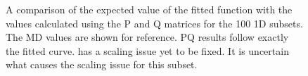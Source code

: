 \documentclass[twoside,senior]{BYUPhys}
\begin{document}
\begin{figure}[ht!]
 \centering
 
 \quad
 \caption[Comparison of the PQ matrices with the expected result for \textlangle{}100\textrangle{} 1D subset.]{\label{appfig:100PQ} A comparison of the expected value of the fitted function with the values calculated using the P and Q matrices for the \textlangle{}100\textrangle{} 1D subsets.  The MD values are shown for reference.  \protect{} PQ results follow exactly the fitted curve.  \protect{} has a scaling issue yet to be fixed.  It is uncertain what causes the scaling issue for this subset.}
\end{figure}
\end{document}
